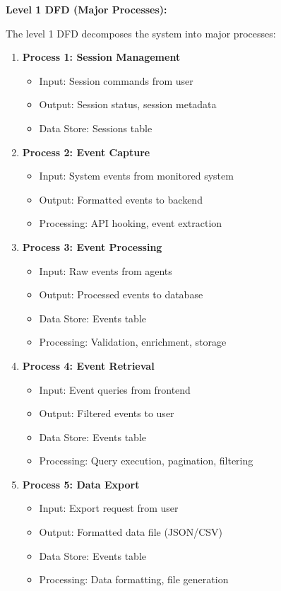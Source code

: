 \textbf{Level 1 DFD (Major Processes):}

The level 1 DFD decomposes the system into major processes:

\begin{enumerate}
    \item \textbf{Process 1: Session Management}
    \begin{itemize}
        \item Input: Session commands from user
        \item Output: Session status, session metadata
        \item Data Store: Sessions table
    \end{itemize}
    
    \item \textbf{Process 2: Event Capture}
    \begin{itemize}
        \item Input: System events from monitored system
        \item Output: Formatted events to backend
        \item Processing: API hooking, event extraction
    \end{itemize}
    
    \item \textbf{Process 3: Event Processing}
    \begin{itemize}
        \item Input: Raw events from agents
        \item Output: Processed events to database
        \item Data Store: Events table
        \item Processing: Validation, enrichment, storage
    \end{itemize}
    
    \item \textbf{Process 4: Event Retrieval}
    \begin{itemize}
        \item Input: Event queries from frontend
        \item Output: Filtered events to user
        \item Data Store: Events table
        \item Processing: Query execution, pagination, filtering
    \end{itemize}
    
    \item \textbf{Process 5: Data Export}
    \begin{itemize}
        \item Input: Export request from user
        \item Output: Formatted data file (JSON/CSV)
        \item Data Store: Events table
        \item Processing: Data formatting, file generation
    \end{itemize}
\end{enumerate}

